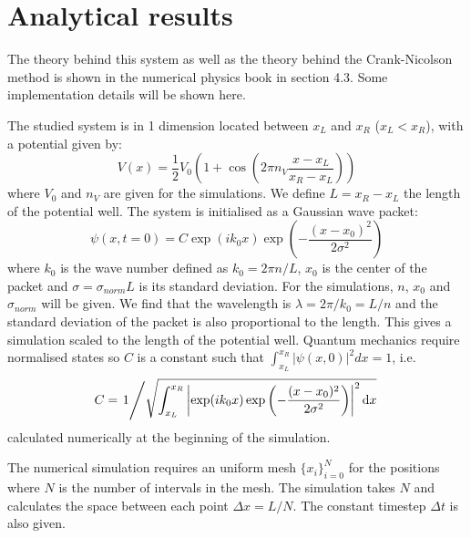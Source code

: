 \section{Analytical results}

The theory behind this system as well as the theory behind the Crank-Nicolson method is shown in the numerical physics book \cite{physnumbook} in section 4.3. Some implementation details will be shown here.

The studied system is in 1 dimension located between \(x_L\) and \(x_R\) (\(x_L < x_R\)), with a potential given by:
\begin{equation}
    V(x) = \frac{1}{2} V_0 \left( 1 + \cos \left( 2\pi n_V \frac{x - x_L}{x_R - x_L} \right) \right)
\end{equation}
where \(V_0\) and \(n_V\) are given for the simulations. We define \(L = x_R - x_L\) the length of the potential well. The system is initialised as a Gaussian wave packet:
\begin{equation}
    \psi(x, t=0) = C \exp(i k_0 x)\exp\left(-\frac{(x-x_0)^2}{2\sigma^2}\right)
\end{equation}
where $k_0$ is the wave number defined as $k_0 = 2\pi n/L$, $x_0$ is the center of the packet and \mbox{$\sigma = \sigma_{norm}L$} is its standard deviation. For the simulations, $n$, $x_0$ and $\sigma_{norm}$ will be given. We find that the wavelength is $\lambda = 2\pi/k_0 = L/n$ and the standard deviation of the packet is also proportional to the length. This gives a simulation scaled to the length of the potential well. Quantum mechanics require normalised states so \(C\) is a constant such that \mbox{\(\int_{x_L}^{x_R}|\psi(x,0)|^2 dx = 1\)}, i.e.
\begin{equation}
    C = \left. 1\middle/\sqrt{\int_{x_L}^{x_R} \left|\exp(i k_0 x)\exp\left(-\frac{(x-x_0)^2}{2\sigma^2}\right)\right|^2 \mathrm{d}x} \right.
\end{equation}
calculated numerically at the beginning of the simulation.

The numerical simulation requires an uniform mesh $\{x_i\}_{i=0}^N$ for the positions where $N$ is the number of intervals in the mesh. The simulation takes $N$ and calculates the space between each point $\Delta x = L/N$. The constant timestep $\Delta t$ is also given.

